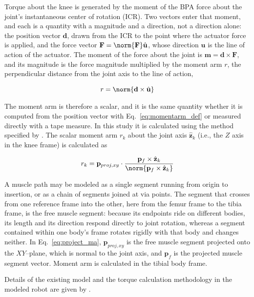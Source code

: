 Torque about the knee is generated by the moment of the BPA force about the joint's instantaneous center of rotation (ICR). Two vectors enter that moment, and each is a quantity with a magnitude and a direction, not a direction alone: the position vector $\mathbf{d}$, drawn from the ICR to the point where the actuator force is applied, and the force vector $\mathbf{F} = \norm{\mathbf{F}}\hat{\mathbf{u}}$, whose direction $\hat{\mathbf{u}}$ is the line of action of the actuator. The moment of the force about the joint is $\mathbf{m} = \mathbf{d} \times \mathbf{F}$, and its magnitude is the force magnitude multiplied by the moment arm $r$, the perpendicular distance from the joint axis to the line of action,

\begin{equation}
    r = \norm{\mathbf{d} \times \hat{\mathbf{u}}}
    \label{eq:momentarm_def}
\end{equation}

The moment arm is therefore a scalar, and it is the same quantity whether it is computed from the position vector with Eq.~\eqref{eq:momentarm_def} or measured directly with a tape measure. In this study it is calculated using the method specified by \citet{young_analyzing_2019}. The scalar moment arm $r_{k}$ about the joint axis $\hat{\mathbf{z}}_{k}$ (i.e., the $Z$ axis in the knee frame) is calculated as 

\begin{equation}
    r_{k} = \mathbf{p}_{proj,xy} \cdot \frac{\mathbf{p}_{f} \times \hat{\mathbf{z}}_{k}} { \norm{\mathbf{p}_{f} \times \hat{\mathbf{z}}_{k}} } \label{eq:project_ma}
\end{equation}

A muscle path may be modeled as a single segment running from origin to insertion, or as a chain of segments joined at via points. The segment that crosses from one reference frame into the other, here from the femur frame to the tibia frame, is the free muscle segment: because its endpoints ride on different bodies, its length and its direction respond directly to joint rotation, whereas a segment contained within one body's frame rotates rigidly with that body and changes neither. In Eq.~\eqref{eq:project_ma}, $\mathbf{p}_{proj,xy}$ is the free muscle segment projected onto the $XY$--plane, which is normal to the joint axis, and $\mathbf{p}_{f}$ is the projected muscle segment vector. Moment arm is calculated in the tibial body frame.

Details of the existing model and the torque calculation methodology in the modeled robot are given by \citet{bolen_determination_2019, morrow_optimization_2020}.

